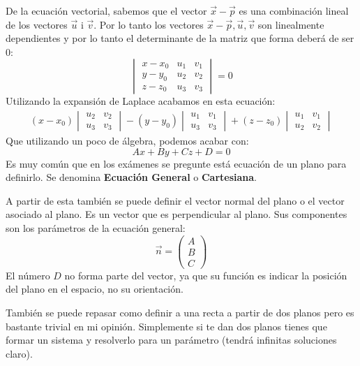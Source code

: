 \documentclass[arial,a4paper,print]{article}
\begin{document}
De la ecuación vectorial, sabemos que el vector $\vec{x}-\vec{p}$ es una combinación lineal de los vectores $\vec{u} \text{ i }\vec{v}$. Por lo tanto los vectores $\vec{x}-\vec{p}, \vec{u}, \vec{v}$ son linealmente dependientes y por lo tanto el determinante de la matriz que forma deberá de ser $0$:
\begin{equation*}
	\begin{vmatrix}
		x-x_{0} & u_{1} & v_{1} \\
		y-y_{0} & u_{2} & v_{2} \\
		z-z_{0} & u_{3} & v_{3} 
	\end{vmatrix} = 0
\end{equation*}
Utilizando la expansión de Laplace acabamos en esta ecuación:
\begin{align*}
	(x-x_{0})\begin{vmatrix}
		u_{2} & v_{2} \\ u_{3} & v_{3}
	\end{vmatrix} - (y-y_{0})\begin{vmatrix}
	u_{1} & v_{1} \\ u_{3} & v_{3}
\end{vmatrix} + (z-z_{0}) \begin{vmatrix}
u_{1} & v_{1} \\ u_{2} & v_{2}
\end{vmatrix}
\end{align*} 
Que utilizando un poco de álgebra, podemos acabar con:
\begin{equation*}
	Ax + By + Cz + D = 0
\end{equation*}
Es muy común que en los exámenes se pregunte está ecuación de un plano para definirlo. Se denomina \textbf{Ecuación General} o \textbf{Cartesiana}. 

A partir de esta también se puede definir el vector normal del plano o el vector asociado al plano. Es un vector que es perpendicular al plano. Sus componentes son los parámetros de la ecuación general:
\begin{equation*}
	\vec{n} = \begin{pmatrix}
		A \\ B \\ C
	\end{pmatrix}
\end{equation*}
El número $D$ no forma parte del vector, ya que su función es indicar la posición del plano en el espacio, no su orientación. 

También se puede repasar como definir a una recta a partir de dos planos pero es bastante trivial en mi opinión. Simplemente si te dan dos planos tienes que formar un sistema y resolverlo para un parámetro (tendrá infinitas soluciones claro). 
\end{document}

